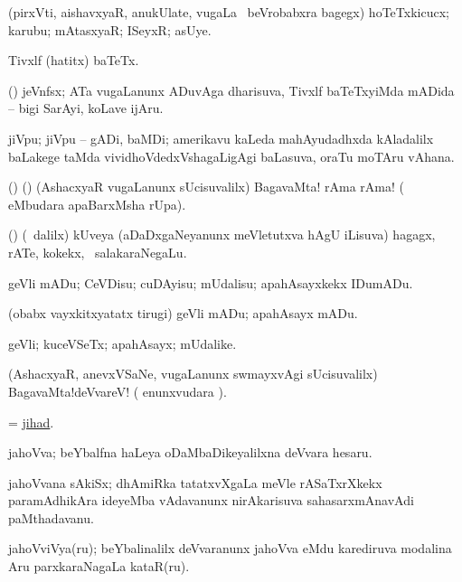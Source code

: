 \bentry
{}
\gl{\nA}
\bmng
(pirxVti, aishavxyaR, anukUlate, \mo vugaLa \vi\ beVrobabxra bagegx) hoTeTxkicucx; karubu; mAtasxyaR; ISeyxR; asUye. 
\emng
\eentry

\bentry
{}
\gl{\nA}
\bmng
Tivxlf (hatitx) baTeTx. 
\emng
\eentry

\bentry
{}
\gl{\nA}
\bmng
(\bava) jeVnfsx; ATa \mo vugaLanunx ADuvAga dharisuva, Tivxlf baTeTxyiMda mADida -- bigi SarAyi, koLave ijAru. 
\emng
\eentry

\bentry
{}
\gl{\nA}
\expl{\P}
\bmng
jiVpu; jiVpu -- gADi, baMDi; amerikavu kaLeda mahAyudadhxda kAladalilx baLakege taMda vividhoVdedxVshagaLigAgi baLasuva, oraTu moTAru vAhana. 
\emng
\eentry

\bentry
{}
\gl{\BAavayx}
\bmng
(\ame) (\ashi) (AshacxyaR \mo vugaLanunx sUcisuvalilx) BagavaMta! rAma rAma! ( eMbudara apaBarxMsha rUpa). 
\emng
\eentry

\bentry
{}
\gl{\nA}
\bmng
(\nw) (\sA\ \bava dalilx) kUveya (aDaDxgaNeyanunx meVletutxva hAgU iLisuva) hagagx, rATe, kokekx, \mo\ salakaraNegaLu. 
\emng
\eentry

\bentry
{}
\gl{\sakirx}
\bmng
geVli mADu; CeVDisu; cuDAyisu; mUdalisu; apahAsayxkekx IDumADu. 
\emng

\noindent
\gl{\akirx}
\bmng
(obabx vayxkitxyatatx tirugi) geVli mADu; apahAsayx mADu. 
\emng
\eentry

\bentry
{}
\gl{\nA}
\bmng
geVli; kuceVSeTx; apahAsayx; mUdalike. 
\emng
\eentry

\bentry
{}
\gl{\BAavayx}
\bmng
(AshacxyaR, anevxVSaNe, \mo vugaLanunx swmayxvAgi sUcisuvalilx) BagavaMta!deVvareV! ( enunxvudara \saMkiSx). 
\emng
\eentry

\bentry
{}
\gl{\nA}
\bmng
= \hyperlink{jihad}{jihad}. 
\emng
\eentry

\bentry
{}
\gl{\nA}
\bmng
ja{hoV}va; beYbalfna haLeya oDaMbaDikeyalilxna deVvara hesaru. 
\emng

\noindent
\gl{\pagu}
\bmng
{} ja{hoV}vana sAkiSx; dhAmiRka tatatxvXgaLa meVle rASaTxrXkekx paramAdhikAra ideyeMba vAdavanunx nirAkarisuva sahasarxmAnavAdi paMthadavanu. 
\emng
\eentry

\bentry
{}
\gl{\nA}
\bmng
ja{hoV}viVya(ru); beYbalinalilx deVvaranunx ja{hoV}va eMdu karediruva modalina Aru parxkaraNagaLa kataR(ru). 
\emng
\eentry

